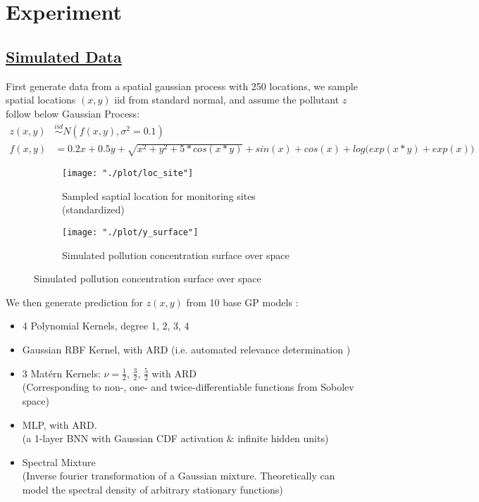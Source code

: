 \documentclass[11pt]{article}
\theoremstyle{definition}
\begin{document}
\section{\textbf{Experiment}}

\subsection{\underline{\textbf{Simulated Data}}}
First generate data from a spatial gaussian process with 250 locations, we sample spatial locations $(x, y)$ iid from standard normal, and assume the pollutant $z$ follow below Gaussian Process:
\begin{align*}
z(x, y) &\stackrel{iid}{\sim} N(f(x, y), \sigma^2 = 0.1) \\
f(x, y) &= 0.2 x + 0.5 y + \sqrt{x^2 + y^2 + 5*cos(x*y)} + 
sin(x) + cos(x) + log\Big(exp(x*y)+exp(x)\Big)
\end{align*}

\begin{figure}[!ht]
\begin{subfigure}{.5\textwidth}
  \centering
  \texttt{[image: "./plot/loc\_site"]}
  \caption{Sampled saptial location for monitoring sites (standardized)}
  \label{fig:sfig1}
\end{subfigure}%
\begin{subfigure}{.5\textwidth}
  \centering
  \texttt{[image: "./plot/y\_surface"]}
  \caption{Simulated pollution concentration surface over space}
  \label{fig:sfig2}
\end{subfigure}
\label{fig:fig}
\end{figure}

We then generate prediction for $z(x, y)$ from 10 base GP models \citep{duvenaud_structure_2013}:
\begin{itemize}
\item 4 Polynomial Kernels, degree 1, 2, 3, 4
\item Gaussian RBF Kernel, with ARD (i.e. automated relevance determination \citep{neal_mcmc_2012})
\item 3 Mat\'{e}rn Kernels: $\nu = \frac{1}{2}$, $\frac{3}{2}$, $\frac{5}{2}$ with ARD \\
(Corresponding to non-, one- and twice-differentiable functions from Sobolev space)
\item MLP, with ARD. \citep{williams_computation_1998} \\
(a 1-layer BNN with Gaussian CDF activation $\&$ infinite hidden units)
\item Spectral Mixture \citep{wilson_gaussian_2013}\\
(Inverse fourier transformation of a Gaussian mixture. Theoretically can model the spectral density of arbitrary stationary functions)
\end{itemize} 
\end{document}
